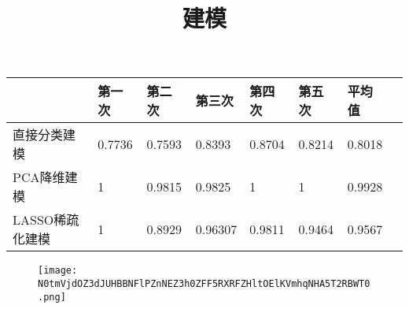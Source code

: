 \documentclass[tp12]{ctexart}
\title{建模}
\author{}
\date{}
\begin{document}
\begin{center}

    \begin{tabular}{l l l l l l l l}
    \hline
    ~&第一次&第二次&第三次&第四次&第五次&平均值\\
    \hline
    直接分类建模&0.7736&0.7593&0.8393&0.8704&0.8214&0.8018\\
    PCA降维建模&1&0.9815&0.9825&1&1&0.9928\\
    LASSO稀疏化建模&1&0.8929&0.96307&0.9811&0.9464&0.9567\\
    \hline
    \end{tabular}

\end{center}

    \begin{figure}[H]
    \centering
    \texttt{[image: N0tmVjdOZ3dJUHBBNFlPZnNEZ3h0ZFF5RXRFZHltOElKVmhqNHA5T2RBWT0.png]}
    \label{}
    \end{figure}
\end{document}

